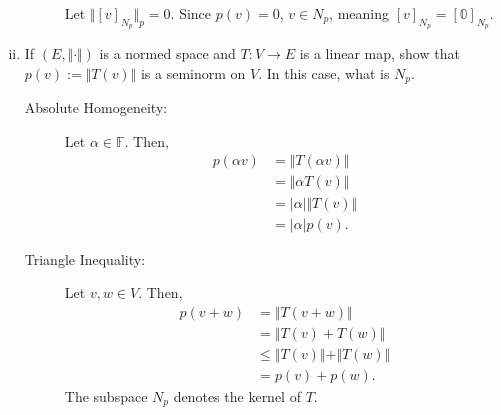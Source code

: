 \documentclass[10pt]{extarticle}
\begin{document}
\begin{enumerate}[(i)]
\begin{description}
          Let $\Vert [v]_{N_p}\Vert_{p} = 0$. Since $p(v) = 0$, $v\in N_{p}$, meaning $[v]_{N_p} = [\mathbb{0}]_{N_p}$.
      \end{description}
    \item If $(E,\Vert\cdot\Vert)$ is a normed space and $T: V\rightarrow E$ is a linear map, show that $p(v) := \Vert T(v)\Vert$ is a seminorm on $V$. In this case, what is $N_p$.
      \begin{description}
        \item[Absolute Homogeneity:] Let $\alpha\in \mathbb{F}$. Then,
          \begin{align*}
            p(\alpha v) &= \Vert T(\alpha v)\Vert\\
                        &= \Vert \alpha T(v)\Vert\\
                        &= |\alpha|\Vert T(v)\Vert\\
                        &= |\alpha| p(v).
          \end{align*}
        \item[Triangle Inequality:] Let $v,w\in V$. Then,
          \begin{align*}
            p(v + w) &= \Vert T(v+w)\Vert\\
                     &= \Vert T(v) + T(w)\Vert\\
                     &\leq \Vert T(v)\Vert + \Vert T(w)\Vert\\
                     &= p(v) + p(w).
          \end{align*}
          The subspace $N_p$ denotes the kernel of $T$.
      \end{description}
  \end{enumerate}
\end{document}
